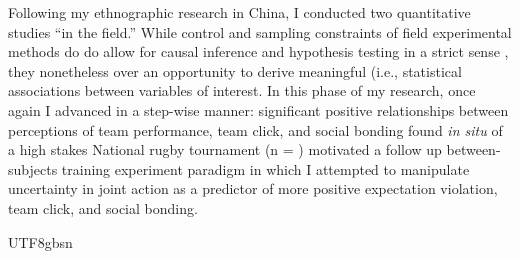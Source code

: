 \begin{CJK}{UTF8}{gbsn}
Following my ethnographic research in China, I conducted two quantitative studies ``in the field.''  While control and sampling constraints of field experimental methods do do allow for causal inference and hypothesis testing in a strict sense \citep[i.e., based on the assumptions of stringent randomisation and controlled conditions; see, for example][]{}, they nonetheless over an opportunity to derive meaningful (i.e., statistical associations between variables of interest.  In this phase of my research, once again I advanced in a step-wise manner: significant positive relationships between perceptions of team performance, team click, and social bonding found \textit{in situ} of a high stakes National rugby tournament (n = ) motivated a follow up between-subjects training experiment paradigm in which I attempted to manipulate uncertainty in joint action as a predictor of more positive expectation violation, team click, and social bonding.





























\end{CJK}{UTF8}{gbsn}
